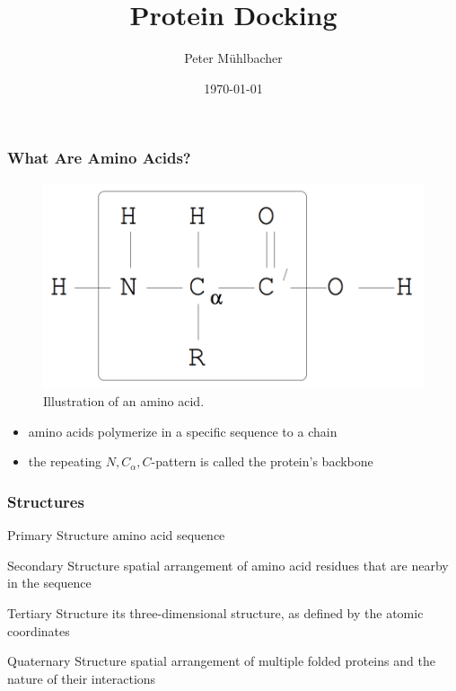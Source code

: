 \documentclass{beamer}
\title[Protein Docking]{Protein Docking}
\author{Peter M\"uhlbacher}
\date{\today}
\begin{document}
\begin{frame}
\titlepage
\end{frame}


\begin{frame}
\frametitle{What Are Amino Acids?}

\begin{figure}
\caption{Illustration of an amino acid. \cite{neumaier}}
\includegraphics[width=0.7\linewidth]{aminoacid.png}
\end{figure}

\begin{itemize}
	\item amino acids polymerize in a specific sequence to a chain
	\item the repeating $N,C_\alpha,C$-pattern is called the protein's backbone
\end{itemize}

\end{frame}


\begin{frame}
\frametitle{Structures}

\begin{block}{Primary Structure}
amino acid sequence
\end{block}

\begin{block}{Secondary Structure}
spatial arrangement of amino acid residues that are nearby in the sequence
\end{block}

\begin{block}{Tertiary Structure}
its three-dimensional structure, as defined by the atomic coordinates
\end{block}

\begin{block}{Quaternary Structure}
spatial arrangement of multiple folded proteins and the nature of their interactions
\end{block}


\end{frame}
\end{document}
